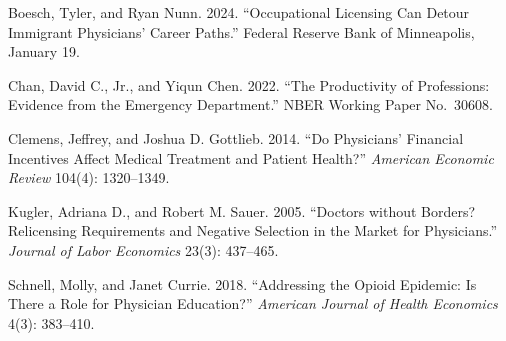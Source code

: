 \documentclass[12pt]{article}
\begin{document}
\noindent Boesch, Tyler, and Ryan Nunn. 2024. ``Occupational Licensing Can Detour Immigrant Physicians' Career Paths.'' Federal Reserve Bank of Minneapolis, January 19.

\noindent Chan, David C., Jr., and Yiqun Chen. 2022. ``The Productivity of Professions: Evidence from the Emergency Department.'' NBER Working Paper No.\ 30608.

\noindent Clemens, Jeffrey, and Joshua D. Gottlieb. 2014. ``Do Physicians' Financial Incentives Affect Medical Treatment and Patient Health?'' \textit{American Economic Review} 104(4): 1320--1349.

\noindent Kugler, Adriana D., and Robert M. Sauer. 2005. ``Doctors without Borders? Relicensing Requirements and Negative Selection in the Market for Physicians.'' \textit{Journal of Labor Economics} 23(3): 437--465.

\noindent Schnell, Molly, and Janet Currie. 2018. ``Addressing the Opioid Epidemic: Is There a Role for Physician Education?'' \textit{American Journal of Health Economics} 4(3): 383--410.
\end{document}
